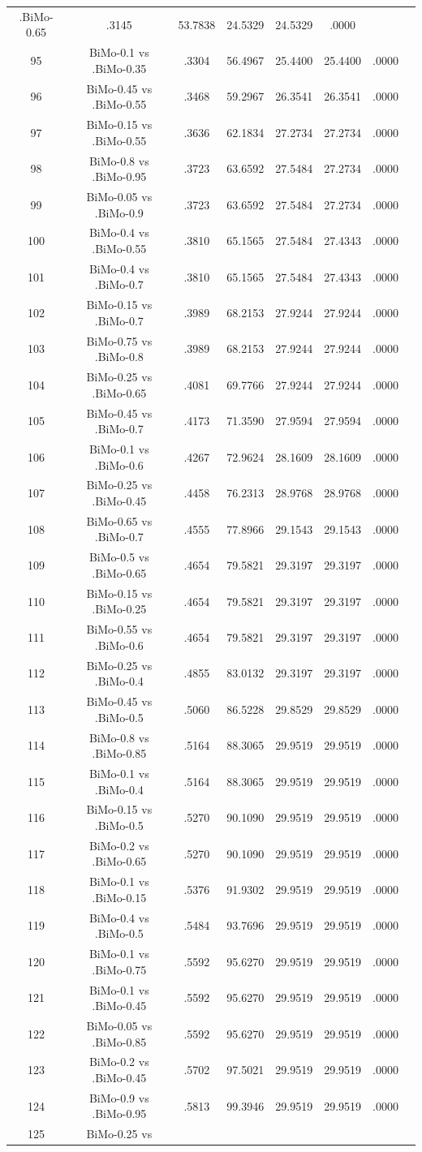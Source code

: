 \documentclass[a4paper,10pt]{article}
\begin{document}
\begin{landscape}
\begin{table}[!htp]
\begin{tabular}{cccccccc}
.BiMo-0.65&.3145&53.7838&24.5329&24.5329&.0000\\95&BiMo-0.1 vs .BiMo-0.35&.3304&56.4967&25.4400&25.4400&.0000\\96&BiMo-0.45 vs .BiMo-0.55&.3468&59.2967&26.3541&26.3541&.0000\\97&BiMo-0.15 vs .BiMo-0.55&.3636&62.1834&27.2734&27.2734&.0000\\98&BiMo-0.8 vs .BiMo-0.95&.3723&63.6592&27.5484&27.2734&.0000\\99&BiMo-0.05 vs .BiMo-0.9&.3723&63.6592&27.5484&27.2734&.0000\\100&BiMo-0.4 vs .BiMo-0.55&.3810&65.1565&27.5484&27.4343&.0000\\101&BiMo-0.4 vs .BiMo-0.7&.3810&65.1565&27.5484&27.4343&.0000\\102&BiMo-0.15 vs .BiMo-0.7&.3989&68.2153&27.9244&27.9244&.0000\\103&BiMo-0.75 vs .BiMo-0.8&.3989&68.2153&27.9244&27.9244&.0000\\104&BiMo-0.25 vs .BiMo-0.65&.4081&69.7766&27.9244&27.9244&.0000\\105&BiMo-0.45 vs .BiMo-0.7&.4173&71.3590&27.9594&27.9594&.0000\\106&BiMo-0.1 vs .BiMo-0.6&.4267&72.9624&28.1609&28.1609&.0000\\107&BiMo-0.25 vs .BiMo-0.45&.4458&76.2313&28.9768&28.9768&.0000\\108&BiMo-0.65 vs .BiMo-0.7&.4555&77.8966&29.1543&29.1543&.0000\\109&BiMo-0.5 vs .BiMo-0.65&.4654&79.5821&29.3197&29.3197&.0000\\110&BiMo-0.15 vs .BiMo-0.25&.4654&79.5821&29.3197&29.3197&.0000\\111&BiMo-0.55 vs .BiMo-0.6&.4654&79.5821&29.3197&29.3197&.0000\\112&BiMo-0.25 vs .BiMo-0.4&.4855&83.0132&29.3197&29.3197&.0000\\113&BiMo-0.45 vs .BiMo-0.5&.5060&86.5228&29.8529&29.8529&.0000\\114&BiMo-0.8 vs .BiMo-0.85&.5164&88.3065&29.9519&29.9519&.0000\\115&BiMo-0.1 vs .BiMo-0.4&.5164&88.3065&29.9519&29.9519&.0000\\116&BiMo-0.15 vs .BiMo-0.5&.5270&90.1090&29.9519&29.9519&.0000\\117&BiMo-0.2 vs .BiMo-0.65&.5270&90.1090&29.9519&29.9519&.0000\\118&BiMo-0.1 vs .BiMo-0.15&.5376&91.9302&29.9519&29.9519&.0000\\119&BiMo-0.4 vs .BiMo-0.5&.5484&93.7696&29.9519&29.9519&.0000\\120&BiMo-0.1 vs .BiMo-0.75&.5592&95.6270&29.9519&29.9519&.0000\\121&BiMo-0.1 vs .BiMo-0.45&.5592&95.6270&29.9519&29.9519&.0000\\122&BiMo-0.05 vs .BiMo-0.85&.5592&95.6270&29.9519&29.9519&.0000\\123&BiMo-0.2 vs .BiMo-0.45&.5702&97.5021&29.9519&29.9519&.0000\\124&BiMo-0.9 vs .BiMo-0.95&.5813&99.3946&29.9519&29.9519&.0000\\125&BiMo-0.25 vs 
\end{tabular}
\end{table}
\end{landscape}
\end{document}
